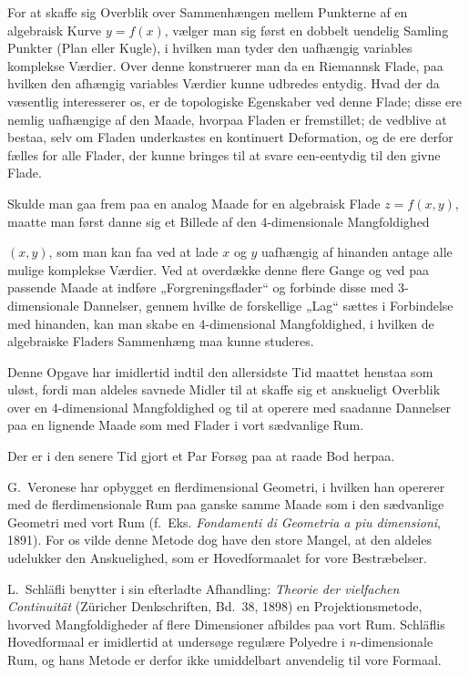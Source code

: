 \documentclass{article}
\begin{document}
For at skaffe sig Overblik over Sammenhængen mellem Punkterne af en algebraisk Kurve $y = f(x)$, vælger man sig først en dobbelt uendelig Samling Punkter (Plan eller Kugle), i hvilken man tyder den uafhængig variables komplekse Værdier. Over denne konstruerer man da en Riemannsk Flade, paa hvilken den afhængig variables Værdier kunne udbredes entydig. Hvad der da væsentlig interesserer os, er de topologiske Egenskaber ved denne Flade; disse ere nemlig uafhængige af den Maade, hvorpaa Fladen er fremstillet; de vedblive at bestaa, selv om Fladen underkastes en kontinuert Deformation, og de ere derfor fælles for alle Flader, der kunne bringes til at svare een-eentydig til den givne Flade.

Skulde man gaa frem paa en analog Maade for en algebraisk Flade $z = f(x, y)$, maatte man først danne sig et Billede af den 4-dimensionale Mangfoldighed

$(x, y)$, som man kan faa ved at lade $x$ og $y$ uafhængig af hinanden antage alle mulige komplekse Værdier. Ved at overdække denne flere Gange og ved paa passende Maade at indføre „Forgreningsflader“ og forbinde disse med 3-dimensionale Dannelser, gennem hvilke de forskellige „Lag“ sættes i Forbindelse med hinanden, kan man skabe en 4-dimensional Mangfoldighed, i hvilken de algebraiske Fladers Sammenhæng maa kunne studeres.

Denne Opgave har imidlertid indtil den allersidste Tid maattet henstaa som uløst, fordi man aldeles savnede Midler til at skaffe sig et anskueligt Overblik over en 4-dimensional Mangfoldighed og til at operere med saadanne Dannelser paa en lignende Maade som med Flader i vort sædvanlige Rum.

Der er i den senere Tid gjort et Par Forsøg paa at raade Bod herpaa.

G.~Veronese har opbygget en flerdimensional Geometri, i hvilken han opererer med de flerdimensionale Rum paa ganske samme Maade som i den sædvanlige Geometri med vort Rum (f.~Eks. \emph{Fondamenti di Geometria a piu dimensioni}, 1891). For os vilde denne Metode dog have den store Mangel, at den aldeles udelukker den Anskuelighed, som er Hovedformaalet for vore Bestræbelser.

L.~Schläfli benytter i sin efterladte Afhandling: \emph{Theorie der vielfachen Continuität} (Züricher Denkschriften, Bd.~38, 1898) en Projektionsmetode, hvorved Mangfoldigheder af flere Dimensioner afbildes paa vort Rum. Schläflis Hovedformaal er imidlertid at undersøge regulære Polyedre i $n$-dimensionale Rum, og hans Metode er derfor ikke umiddelbart anvendelig til vore Formaal.
\end{document}
